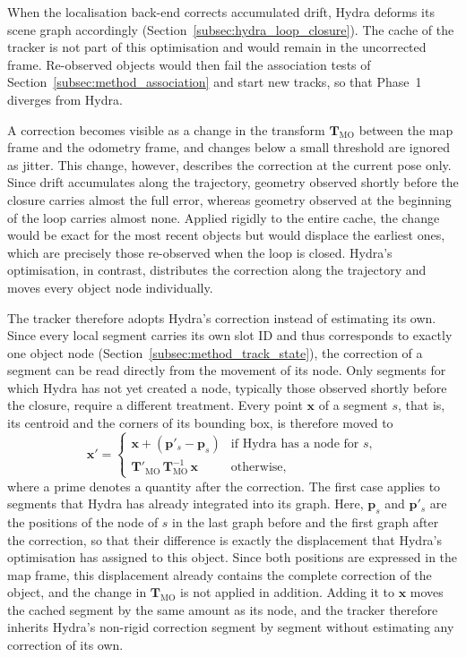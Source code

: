 {\small
When the localisation back-end corrects accumulated drift, Hydra deforms its scene graph accordingly (Section~\ref{subsec:hydra_loop_closure}). The cache of the tracker is not part of this optimisation and would remain in the uncorrected frame. Re-observed objects would then fail the association tests of Section~\ref{subsec:method_association} and start new tracks, so that Phase~1 diverges from Hydra.

A correction becomes visible as a change in the transform $\mathbf{T}_{\mathrm{MO}}$ between the map frame and the odometry frame, and changes below a small threshold are ignored as jitter. This change, however, describes the correction at the current pose only. Since drift accumulates along the trajectory, geometry observed shortly before the closure carries almost the full error, whereas geometry observed at the beginning of the loop carries almost none. Applied rigidly to the entire cache, the change would be exact for the most recent objects but would displace the earliest ones, which are precisely those re-observed when the loop is closed. Hydra's optimisation, in contrast, distributes the correction along the trajectory and moves every object node individually.

The tracker therefore adopts Hydra's correction instead of estimating its own. Since every local segment carries its own slot ID and thus corresponds to exactly one object node (Section~\ref{subsec:method_track_state}), the correction of a segment can be read directly from the movement of its node. Only segments for which Hydra has not yet created a node, typically those observed shortly before the closure, require a different treatment. Every point $\mathbf{x}$ of a segment $s$, that is, its centroid and the corners of its bounding box, is therefore moved to
\begin{equation}
	\mathbf{x}' =
	\begin{cases}
		\mathbf{x} + \left(\mathbf{p}'_s - \mathbf{p}_s\right) & \text{if Hydra has a node for } s,\\[4pt]
		\mathbf{T}'_{\mathrm{MO}}\,\mathbf{T}_{\mathrm{MO}}^{-1}\,\mathbf{x} & \text{otherwise},
	\end{cases}
	\label{eq:reanchor}
\end{equation}
where a prime denotes a quantity after the correction. The first case applies to segments that Hydra has already integrated into its graph. Here, $\mathbf{p}_s$ and $\mathbf{p}'_s$ are the positions of the node of $s$ in the last graph before and the first graph after the correction, so that their difference is exactly the displacement that Hydra's optimisation has assigned to this object. Since both positions are expressed in the map frame, this displacement already contains the complete correction of the object, and the change in $\mathbf{T}_{\mathrm{MO}}$ is not applied in addition. Adding it to $\mathbf{x}$ moves the cached segment by the same amount as its node, and the tracker therefore inherits Hydra's non-rigid correction segment by segment without estimating any correction of its own.

}
